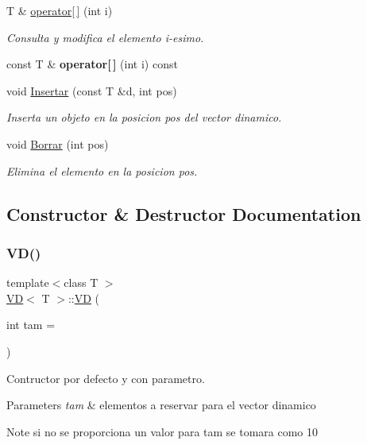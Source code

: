 \begin{DoxyCompactItemize}
T \& \hyperlink{class_v_d_a7d80240b5791d62b7e27657763afe712}{operator\mbox{[}$\,$\mbox{]}} (int i)
\begin{DoxyCompactList}\small\item\em Consulta y modifica el elemento i-\/esimo. \end{DoxyCompactList}\item 
\mbox{\label{class_v_d_a16ae24a4b545a02baf6733ba5c066346}} 
const T \& {\bfseries operator\mbox{[}$\,$\mbox{]}} (int i) const
\item 
void \hyperlink{class_v_d_aded65b5f02cceb9780303afd5c88acb8}{Insertar} (const T \&d, int pos)
\begin{DoxyCompactList}\small\item\em Inserta un objeto en la posicion pos del vector dinamico. \end{DoxyCompactList}\item 
void \hyperlink{class_v_d_a13528c6fae34510d10699f426de88e27}{Borrar} (int pos)
\begin{DoxyCompactList}\small\item\em Elimina el elemento en la posicion pos. \end{DoxyCompactList}\end{DoxyCompactItemize}


\subsection{Constructor \& Destructor Documentation}
\mbox{\label{class_v_d_a1ce73549d14f68caecaa593de3255c30}} 
\subsubsection{\texorpdfstring{V\+D()}{VD()}\hspace{0.1cm}{\footnotesize\ttfamily [1/2]}}
{\footnotesize\ttfamily template$<$class T $>$ \\
\hyperlink{class_v_d}{VD}$<$ T $>$\+::\hyperlink{class_v_d}{VD} (\begin{DoxyParamCaption}\item[{int}]{tam = {} }\end{DoxyParamCaption})}



Contructor por defecto y con parametro. 


\begin{DoxyParams}{Parameters}
{\em tam} & elementos a reservar para el vector dinamico \\
\hline
\end{DoxyParams}
\begin{DoxyNote}{Note}
si no se proporciona un valor para tam se tomara como 10 
\end{DoxyNote}
\mbox{\label{class_v_d_a4f22b92dd8ace25d50311ccd61508dfc}} 
